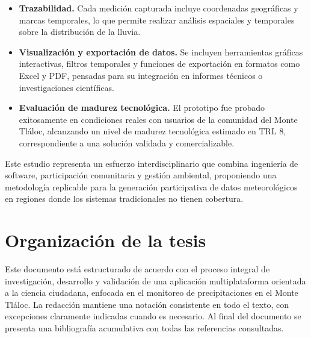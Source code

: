 \begin{itemize}
  \item \textbf{Trazabilidad.} Cada medición capturada incluye coordenadas geográficas y marcas temporales, lo que permite realizar análisis espaciales y temporales sobre la distribución de la lluvia.
  
  \item \textbf{Visualización y exportación de datos.} Se incluyen herramientas gráficas interactivas, filtros temporales y funciones de exportación en formatos como Excel y PDF, pensadas para su integración en informes técnicos o investigaciones científicas.
  
  \item \textbf{Evaluación de madurez tecnológica.} El prototipo fue probado exitosamente en condiciones reales con usuarios de la comunidad del Monte Tláloc, alcanzando un nivel de madurez tecnológica estimado en TRL 8, correspondiente a una solución validada y comercializable.
\end{itemize}

Este estudio representa un esfuerzo interdisciplinario que combina ingeniería de software, participación comunitaria y gestión ambiental, proponiendo una metodología replicable para la generación participativa de datos meteorológicos en regiones donde los sistemas tradicionales no tienen cobertura.




\section{Organización de la tesis}

Este documento está estructurado de acuerdo con el proceso integral de investigación, desarrollo y validación de una aplicación multiplataforma orientada a la ciencia ciudadana, enfocada en el monitoreo de precipitaciones en el Monte Tláloc. La redacción mantiene una notación consistente en todo el texto, con excepciones claramente indicadas cuando es necesario. Al final del documento se presenta una bibliografía acumulativa con todas las referencias consultadas.

